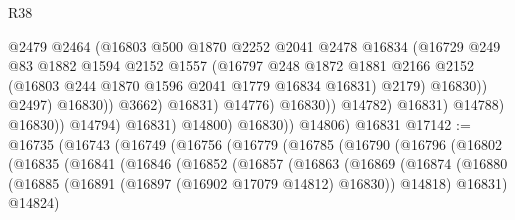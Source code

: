 \begin{lexlean}{R38}
\begin{coremodule}
                                          @2479
                                          @2464
                                          (@16803
                                            @500
                                            @1870
                                            @2252
                                            @2041
                                            @2478
                                            @16834
                                            (@16729
                                              @249
                                              @83
                                              @1882
                                              @1594
                                              @2152
                                              @1557
                                              (@16797
                                                @248
                                                @1872
                                                @1881
                                                @2166
                                                @2152
                                                (@16803 @244 @1870 @1596 @2041 @1779 @16834 @16831)
                                                @2179)
                                              @16830))
                                          @2497)
                                        @16830))
                                    @3662)
                                  @16831)
                                @14776)
                              @16830))
                          @14782)
                        @16831)
                      @14788)
                    @16830))
                @14794)
              @16831)
            @14800)
          @16830))
      @14806)
    @16831
@17142 := @16735
    (@16743
      (@16749
        (@16756
          (@16779
            (@16785
              (@16790
                (@16796
                  (@16802
                    (@16835
                      (@16841
                        (@16846
                          (@16852
                            (@16857
                              (@16863
                                (@16869
                                  (@16874
                                    (@16880
                                      (@16885
                                        (@16891 (@16897 (@16902 @17079 @14812) @16830))
                                        @14818)
                                      @16831)
                                    @14824)

\end{coremodule}
\end{lexlean}
